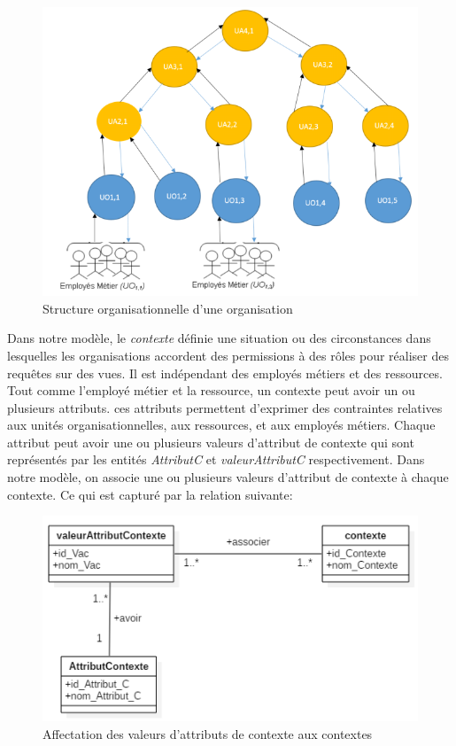 \begin{figure}[h!]
    \centering
		\includegraphics[scale=0.7]{chap3/images/structureorg.png}
    \caption{Structure organisationnelle d'une organisation}
	 \label{figstructure}
\end{figure} 

\label{sectionContexte}

Dans notre modèle, le \textit{contexte} définie une situation ou des circonstances dans lesquelles les organisations accordent des permissions à des rôles pour réaliser des requêtes sur des vues. Il est indépendant des employés métiers et des ressources. Tout comme l'employé métier et la ressource, un contexte peut avoir un ou plusieurs attributs. ces attributs permettent d'exprimer des contraintes relatives aux unités organisationnelles, aux ressources, et aux employés métiers. Chaque attribut peut avoir une ou plusieurs valeurs d'attribut de contexte qui sont représentés par les entités \textit{AttributC} et \textit{valeurAttributC} respectivement. Dans notre modèle, on associe une ou plusieurs valeurs d'attribut de contexte à chaque contexte. Ce qui est capturé par la relation suivante:

\begin{figure}[h!]
    \centering
		\includegraphics[scale=0.7]{chap3/images/contexte_Attribut.png}
    \caption{Affectation des valeurs d'attributs de contexte aux contextes}
	 \label{figcontexte}
\end{figure} 

